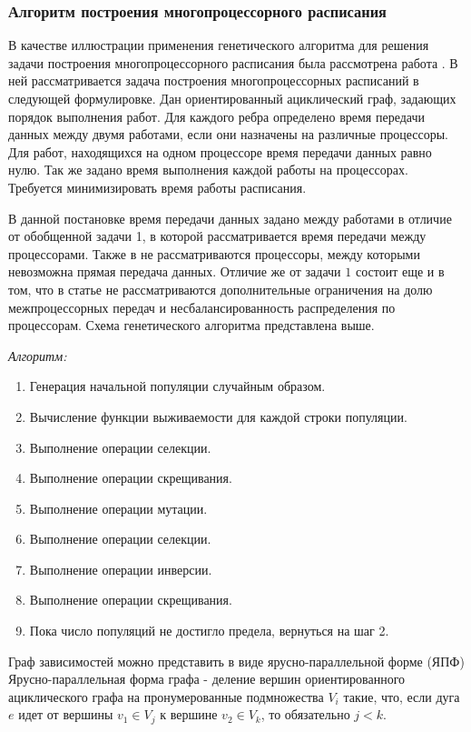 \documentclass{article}
\begin{document}
\subsubsection{Алгоритм построения многопроцессорного расписания}
В качестве иллюстрации применения генетического алгоритма для решения задачи построения многопроцессорного расписания была рассмотрена работа \cite{Mehdi_2015}. В ней рассматривается задача построения многопроцессорных расписаний в следующей формулировке. Дан ориентированный ациклический граф, задающих порядок выполнения работ. Для каждого ребра определено время передачи данных между двумя работами, если они назначены на различные процессоры. Для работ, находящихся на одном процессоре время передачи данных равно нулю. Так же задано время выполнения каждой работы на процессорах. Требуется минимизировать время работы расписания. \par
В данной постановке время передачи данных задано между работами в отличие от обобщенной задачи 1, в которой рассматривается время передачи между процессорами. Также в \cite{Mehdi_2015} не рассматриваются процессоры, между которыми невозможна прямая передача данных. Отличие же от задачи $1$ состоит еще и в том, что в статье не рассматриваются дополнительные ограничения на долю межпроцессорных передач и несбалансированность распределения по процессорам. Схема генетического алгоритма представлена выше. \par
\textit{Алгоритм:}
\begin{enumerate}
  \item Генерация начальной популяции случайным образом.
  \item Вычисление функции выживаемости для каждой строки популяции.
  \item Выполнение операции селекции.
  \item Выполнение операции скрещивания.
  \item Выполнение операции мутации.
  \item Выполнение операции селекции.
  \item Выполнение операции инверсии.
  \item Выполнение операции скрещивания.
  \item Пока число популяций не достигло предела, вернуться на шаг 2.
\end{enumerate}
Граф зависимостей можно представить в виде ярусно-параллельной форме (ЯПФ)\\
Ярусно-параллельная форма графа - деление вершин ориентированного ациклического графа на пронумерованные подмножества $V_i$ такие, что, если дуга $e$ идет от вершины $v_1\in V_j$ к вершине $v_2\in V_k$, то обязательно $j < k$. \par
\end{document}
